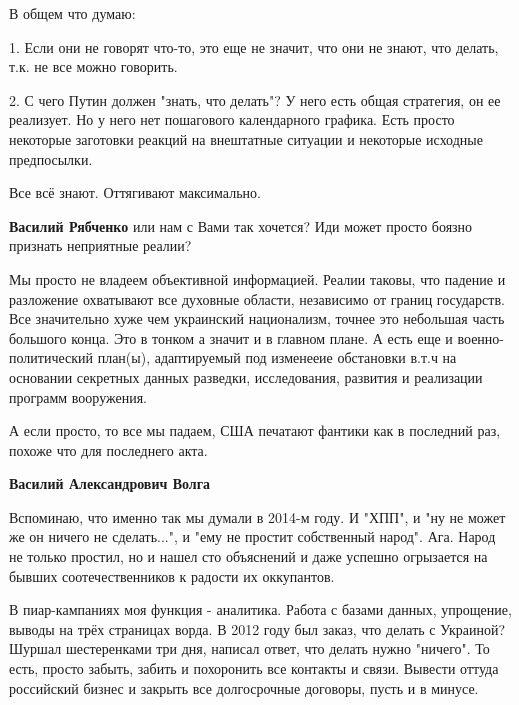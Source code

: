 \begin{itemize}

В общем что думаю:

1. Если они не говорят что-то, это еще не значит, что они не знают, что делать,
т.к. не все можно говорить.

2. С чего Путин должен "знать, что делать"? У него есть общая стратегия, он ее
реализует. Но у него нет пошагового календарного графика. Есть просто некоторые
заготовки реакций на внештатные ситуации и некоторые исходные предпосылки.


Все всё знают. Оттягивают максимально.

\begin{itemize} %
\textbf{Василий Рябченко} или нам с Вами так хочется? Иди может просто боязно признать неприятные реалии?


Мы просто не владеем объективной информацией. Реалии таковы, что падение и
разложение охватывают все духовные области, независимо от границ государств.
Все значительно хуже чем украинский национализм, точнее это небольшая часть
большого конца. Это в тонком а значит и в главном плане. А есть еще и
военно-политический план(ы), адаптируемый под изменееие обстановки в.т.ч на
основании секретных данных разведки, исследования, развития и реализации
программ вооружения.

А если просто, то все мы падаем, США печатают фантики как в последний раз,
похоже что для последнего акта.

\textbf{Василий Александрович Волга} 

Вспоминаю, что именно так мы думали в 2014-м году. И "ХПП", и "ну не может же
он ничего не сделать...", и "ему не простит собственный народ". Ага. Народ не
только простил, но и нашел сто объяснений и даже успешно огрызается на бывших
соотечественников к радости их оккупантов.

\end{itemize} %


В пиар-кампаниях моя функция - аналитика. Работа с базами данных, упрощение,
выводы на трёх страницах ворда. В 2012 году был заказ, что делать с Украиной?
Шуршал шестеренками три дня, написал ответ, что делать нужно "ничего". То есть,
просто забыть, забить и похоронить все контакты и связи. Вывести оттуда
российский бизнес и закрыть все долгосрочные договоры, пусть и в минусе.


\end{itemize}
